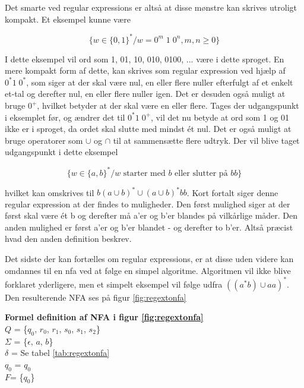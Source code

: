 Det smarte ved regular expressions er altså at disse mønstre kan skrives utroligt kompakt. Et eksempel kunne være 

$$ \{w \in \{0, 1\}^* / w = 0^m\; 1\; 0^n, m,n \geq 0\} $$

\noindent I dette eksempel vil ord som 1, 01, 10, 010, 0100, ... være i dette sproget. En mere kompakt form af dette, kan skrives som regular expression ved hjælp af $ 0^* 1\; 0^* $, som siger at der skal være nul, en eller flere nuller efterfulgt af et enkelt et-tal og derefter nul, en eller flere nuller igen. Det er desuden også muligt at bruge $0^+$, hvilket betyder at der skal være en eller flere. Tages der udgangspunkt i eksemplet før, og ændrer det til $0^* 1\; 0^+$, vil det nu betyde at ord som 1 og 01 ikke er i sproget, da ordet skal slutte med mindst ét nul. Det er også muligt at bruge operatorer som $\cup$ og $\cap$ til at sammensætte flere udtryk. Der vil blive taget udgangspunkt i dette eksempel

$$ \{w \in \{a, b\}^* / w \text{ starter med }b \text{ eller slutter på }bb\} $$

\noindent hvilket kan omskrives til $b(a \cup b)^* \cup (a \cup b)^* bb$. Kort fortalt siger denne regular expression at der findes to muligheder. Den først mulighed siger at der først skal være ét b og derefter må a'er og b'er blandes på vilkårlige måder. Den anden mulighed er først a'er og b'er blandet - og derefter to b'er. Altså præcist hvad den anden definition beskrev.

Det sidste der kan fortælles om regular expressions, er at disse uden videre kan omdannes til en \gls{nfa} ved at følge en simpel algoritme. Algoritmen vil ikke blive forklaret yderligere, men et simpelt eksempel vil følge udfra $((a^*b) \cup aa)^*$. \clearpage Den resulterende NFA ses på figur \ref{fig:regextonfa}


\noindent \textbf{Formel definition af NFA i figur \ref{fig:regextonfa}}\\
\noindent $Q$ = \{$q_0$, $r_0$, $r_1$, $s_0$, $s_1$, $s_2$\}\\
\noindent $\Sigma$ = \{$\epsilon$, $a$, $b$\}\\
\noindent $\delta$ = Se tabel \ref{tab:regextonfa}\\
\noindent $q_0$ = $q_0$\\
\noindent $F$= \{$q_0$\}\\

